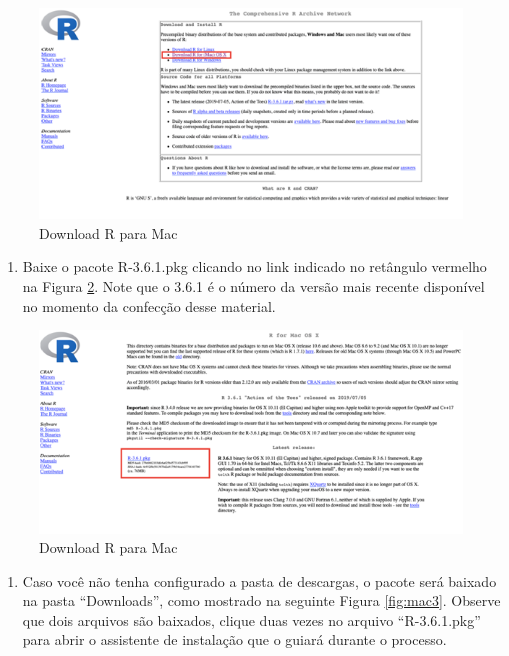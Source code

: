 \documentclass[
]{book}
\providecommand{\tightlist}{%
  \setlength{\itemsep}{0pt}\setlength{\parskip}{0pt}}
\begin{document}
\begin{figure}
\includegraphics[width=1\linewidth]{figures/mac_R_1} \caption{\label{fig:mac1} Download R para Mac}\label{fig:mac1}
\end{figure}

\begin{enumerate}
\def\labelenumi{\arabic{enumi})}
\setcounter{enumi}{1}
\tightlist
\item
  Baixe o pacote R-3.6.1.pkg clicando no link indicado no retângulo vermelho na Figura \ref{fig:mac2}. Note que o 3.6.1 é o número da versão mais recente disponível no momento da confecção desse material.
\end{enumerate}

\begin{figure}
\includegraphics[width=1\linewidth]{figures/mac_R_2} \caption{\label{fig:mac2} Download R para Mac }\label{fig:mac2}
\end{figure}

\begin{enumerate}
\def\labelenumi{\arabic{enumi})}
\setcounter{enumi}{2}
\tightlist
\item
  Caso você não tenha configurado a pasta de descargas, o pacote será baixado na pasta ``Downloads'', como mostrado na seguinte Figura \ref{fig:mac3}. Observe que dois arquivos são baixados, clique duas vezes no arquivo ``R-3.6.1.pkg'' para abrir o assistente de instalação que o guiará durante o processo.
\end{enumerate}
\end{document}

